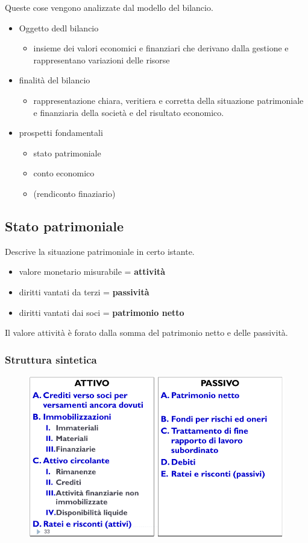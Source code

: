  Queste cose vengono analizzate dal modello del bilancio.


 \begin{itemize}
    \item Oggetto dedl bilancio
        \begin{itemize}
            \item insieme dei valori economici e finanziari che derivano dalla gestione e rappresentano variazioni delle risorse
        \end{itemize}
    \item finalità del bilancio
        \begin{itemize}
            \item rappresentazione chiara, veritiera e corretta della situazione patrimoniale e finanziaria della società e del risultato economico.
        \end{itemize}
    \item prospetti fondamentali
        \begin{itemize}
            \item stato patrimoniale
            \item conto economico
            \item (rendiconto finaziario)
        \end{itemize}
 \end{itemize}

 \subsection{Stato patrimoniale}
 Descrive la situazione patrimoniale in certo istante.

 \begin{itemize}
    \item valore monetario misurabile = \textbf{attività}
    \item diritti vantati da terzi = \textbf{passività}
    \item diritti vantati dai soci = \textbf{patrimonio netto}
 \end{itemize}

 Il valore attività è forato dalla somma del patrimonio netto e delle passività.

 \subsubsection{Struttura sintetica}
 \begin{figure}[H]
    \centering
    \includegraphics[width=0.7\linewidth]{2/img/Screenshot from 2022-07-06 16-07-29.png}
\end{figure}

